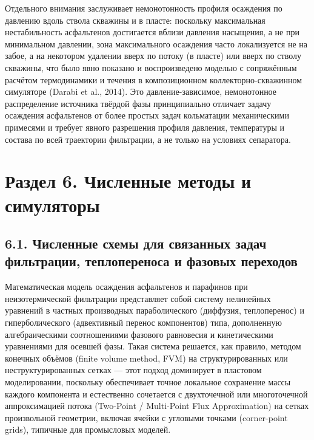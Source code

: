 \documentclass[11pt]{extarticle}
\begin{document}
Отдельного внимания заслуживает немонотонность профиля осаждения по давлению вдоль ствола скважины и в пласте: поскольку максимальная нестабильность асфальтенов достигается вблизи давления насыщения, а не при минимальном давлении, зона максимального осаждения часто локализуется не на забое, а на некотором удалении вверх по потоку (в пласте) или вверх по стволу скважины, что было явно показано и воспроизведено моделью с сопряжённым расчётом термодинамики и течения в композиционном коллекторно-скважинном симуляторе (Darabi et al., 2014). Это давление-зависимое, немонотонное распределение источника твёрдой фазы принципиально отличает задачу осаждения асфальтенов от более простых задач кольматации механическими примесями и требует явного разрешения профиля давления, температуры и состава по всей траектории фильтрации, а не только на условиях сепаратора.

\newpage

\section{Раздел 6. Численные методы и симуляторы}\label{ux440ux430ux437ux434ux435ux43b-6.-ux447ux438ux441ux43bux435ux43dux43dux44bux435-ux43cux435ux442ux43eux434ux44b-ux438-ux441ux438ux43cux443ux43bux44fux442ux43eux440ux44b}

\subsection{6.1. Численные схемы для связанных задач фильтрации, теплопереноса и фазовых переходов}\label{ux447ux438ux441ux43bux435ux43dux43dux44bux435-ux441ux445ux435ux43cux44b-ux434ux43bux44f-ux441ux432ux44fux437ux430ux43dux43dux44bux445-ux437ux430ux434ux430ux447-ux444ux438ux43bux44cux442ux440ux430ux446ux438ux438-ux442ux435ux43fux43bux43eux43fux435ux440ux435ux43dux43eux441ux430-ux438-ux444ux430ux437ux43eux432ux44bux445-ux43fux435ux440ux435ux445ux43eux434ux43eux432}

Математическая модель осаждения асфальтенов и парафинов при неизотермической фильтрации представляет собой систему нелинейных уравнений в частных производных параболического (диффузия, теплоперенос) и гиперболического (адвективный перенос компонентов) типа, дополненную алгебраическими соотношениями фазового равновесия и кинетическими уравнениями для осевшей фазы. Такая система решается, как правило, методом конечных объёмов (finite volume method, FVM) на структурированных или неструктурированных сетках --- этот подход доминирует в пластовом моделировании, поскольку обеспечивает точное локальное сохранение массы каждого компонента и естественно сочетается с двухточечной или многоточечной аппроксимацией потока (Two-Point / Multi-Point Flux Approximation) на сетках произвольной геометрии, включая ячейки с угловыми точками (corner-point grids), типичные для промысловых моделей.
\end{document}
